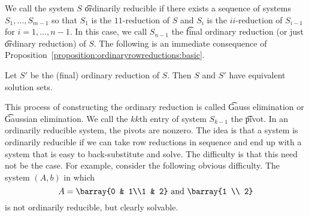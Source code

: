 We call the system $S$ \t{ordinarily reducible} if there exists a sequence of systems $S_1, \dots , S_{m-1}$ so that $S_1$ is the $11$-reduction of $S$ and $S_{i}$ is the $ii$-reduction of $S_{i-1}$ for $i = 1, \dots , n-1$.
In this case, we call $S_{n-1}$ the \t{final ordinary reduction} (or just \t{ordinary reduction}) of $S$.
The following is an immediate consequence of Proposition~\ref{proposition:ordinaryrowreductions:basic}.
\begin{proposition}

  \label{proposition:ordinary_row_reductions:main}Let $S'$ be the (final) ordinary reduction of $S$. Then $S$ and $S'$ have equivalent solution sets.
\end{proposition}


This process of constructing the ordinary reduction is called \t{Gauss elimination} or \t{Gaussian elimination}.
We call the $kk$th entry of system $S_{k-1}$ the \t{pivot}.
In an ordinarily reducible system, the pivots are nonzero.
The idea is that a system is ordinarily reducible if we can take row reductions in sequence and end up with a system that is easy to back-substitute and solve.
The difficulty is that this need not be the case.
For example, consider the following obvious difficulty.
The system $(A, b)$ in which
\[
A = \barray{0 & 1\\1 & 2} \text{ and } \barray{1 \\ 2}
\]
is not ordinarily reducible, but clearly solvable.

